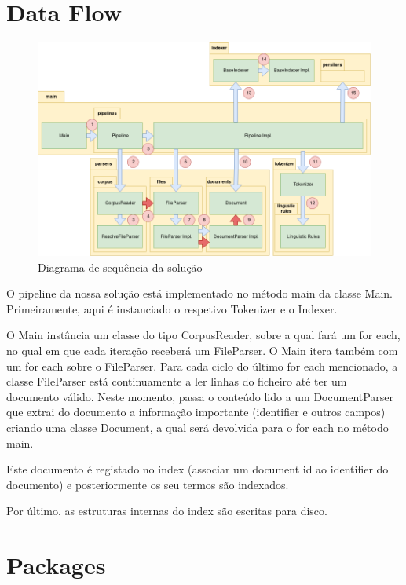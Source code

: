 \documentclass[12pt]{article}
\begin{document}
\section{Data Flow}
\begin{figure}[h]
  \center
  \includegraphics[width=17cm]{newsequenceDiagram.png}
  \caption{Diagrama de sequência da solução}
\end{figure}

O pipeline da nossa solução está implementado no método main da classe
Main. Primeiramente, aqui é instanciado o respetivo Tokenizer e o Indexer.

O Main instância um classe do tipo CorpusReader, sobre a qual fará um for each, no
qual em que cada iteração receberá um FileParser. O Main itera também com um
for each sobre o FileParser. Para cada ciclo do último for each mencionado, a classe
FileParser está continuamente a ler linhas do ficheiro até ter um documento
válido. Neste momento, passa o conteúdo lido a um DocumentParser que extrai
do documento a informação importante (identifier e outros campos) criando
uma classe Document, a qual será devolvida para o for each no método main.

Este documento é registado no index (associar um document id ao identifier do
documento) e posteriormente os seu termos são indexados.

Por último, as estruturas internas do index são escritas para disco.

\section{Packages}
\end{document}
